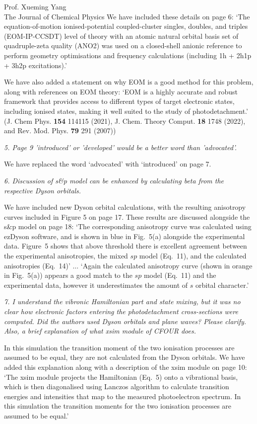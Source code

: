 \documentclass[a4paper,12pt]{letter}
\begin{document}
\begin{sf}
\begin{letter}{%
Prof. Xueming Yang\\
The Journal of Chemical Physics
}
We have included these details on page 6: `The equation-of-motion ionised-potential coupled-cluster singles, doubles, and triples (EOM-IP-CCSDT) level of theory with an atomic natural orbital basis set of quadruple-zeta quality (ANO2) was used on a closed-shell anionic reference to perform geometry optimisations and frequency calculations (including 1h + 2h1p + 3h2p excitations).' 

We have also added a statement on why EOM is a good method for this problem, along with references on EOM theory: `EOM is a highly accurate and robust framework that provides access to different types of target electronic states, including ionised states, making it well suited to the study of photodetachment.' (J. Chem Phys. {\bf154} 114115 (2021), J. Chem. Theory Comput. {\bf18} 1748 (2022), and Rev. Mod. Phys. {\bf79} 291 (2007))

\emph{5. Page 9 'introduced' or 'developed' would be a better word than 'advocated'.}

We have replaced the word `advocated' with `introduced' on page 7.

\emph{6. Discussion of s\&p model can be enhanced by calculating beta from the respective Dyson orbitals.}

We have included new Dyson orbital calculations, with the resulting anisotropy curves included in Figure 5 on page 17. These results are discussed alongside the s\&p model on page 18: `The corresponding anisotropy curve was calculated using ezDyson software, and is shown in blue in Fig.~5(a) alongside the experimental data. Figure~5 shows that above threshold there is excellent agreement between the experimental anisotropies, the mixed $sp$ model (Eq.~11), and the calculated anisotropies (Eq.~14)' $\dots$ `Again the calculated anisotropy curve (shown in orange in Fig.~5(a)) appears a good match to the $sp$ model (Eq.~11) and the experimental data, however it underestimates the amount of $s$ orbital character.'

\emph{7. I understand the vibronic Hamiltonian part and state mixing, but it was no clear how electronic factors entering the photodetachment cross-sections were computed. Did the authors used Dyson orbitals and plane waves? Please clarify. Also, a brief explanation of what xsim module of CFOUR does.}

In this simulation the transition moment of the two ionisation processes are assumed to be equal, they are not calculated from the Dyson orbitals. We have added this explanation along with a description of the xsim module on page 10: `The xsim module projects the Hamiltonian (Eq.~5) onto a vibrational basis, which is then diagonalised using Lanczos algorithm to calculate transition energies and intensities that map to the measured photoelectron spectrum. In this simulation the transition moments for the two ionisation processes are assumed to be equal.' 


\end{letter}
\end{sf}
\end{document}
